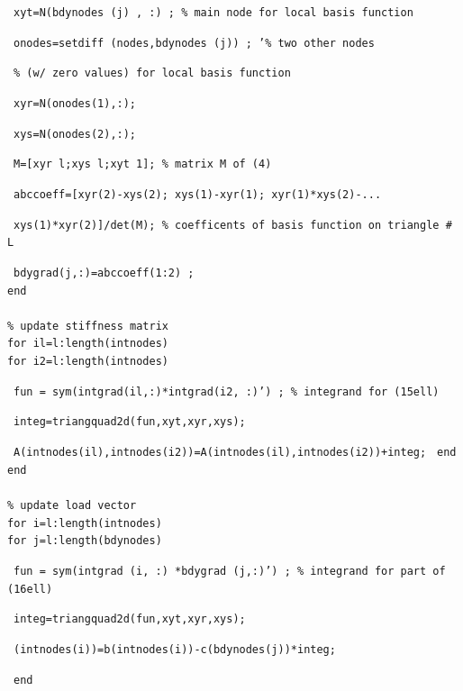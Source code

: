 \documentclass[../main.tex]{subfiles}
\begin{document}
~\texttt{xyt=N(bdynodes (j) , :) ; \% main node for local basis function}

~\texttt{onodes=setdiff (nodes,bdynodes (j)) ; '\% two other nodes}

~\texttt{\% (w/ zero values) for local basis function}

~\texttt{xyr=N(onodes(1),:);}

~\texttt{xys=N(onodes(2),:); 
}

~\texttt{M=[xyr l;xys l;xyt 1]; \% matrix M of (4) }

~\texttt{abccoeff=[xyr(2)-xys(2); xys(1)-xyr(1); xyr(1)*xys(2)-... 
}

~\texttt{xys(1)*xyr(2)]/det(M); \% coefficents of basis function on triangle \# L }

~\texttt{bdygrad(j,:)=abccoeff(1:2) ; 
}
\\
\texttt{end}
\\
\\
\texttt{\% update stiffness matrix}\\
\texttt{for il=l:length(intnodes)}\\
\texttt{for i2=l:length(intnodes)}

~\texttt{fun = sym(intgrad(il,:)*intgrad(i2, :)') ; \% integrand for (15ell)}

~\texttt{integ=triangquad2d(fun,xyt,xyr,xys);}

~\texttt{A(intnodes(il),intnodes(i2))=A(intnodes(il),intnodes(i2))+integ; }
\texttt{end}\\
\texttt{end}
\\
\\
\texttt{\% update load vector}\\
\texttt{for i=l:length(intnodes) }\\
\texttt{for j=l:length(bdynodes)}

~\texttt{fun = sym(intgrad (i, :) *bdygrad (j,:)') ; \% integrand for part of (16ell)}

~\texttt{integ=triangquad2d(fun,xyt,xyr,xys);}

~\texttt{(intnodes(i))=b(intnodes(i))-c(bdynodes(j))*integ; }

~\texttt{end}
\end{document}
